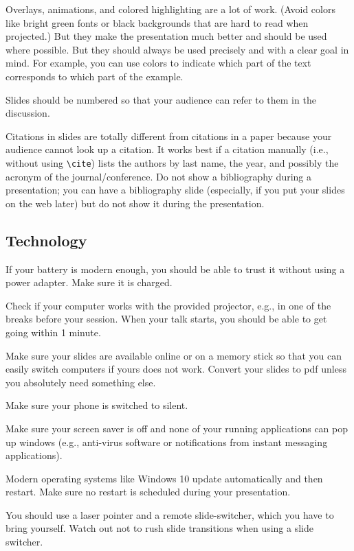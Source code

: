 \documentclass[12pt]{article}
\begin{document}
Overlays, animations, and colored highlighting are a lot of work.
(Avoid colors like bright green fonts or black backgrounds that are hard to read when projected.)
But they make the presentation much better and should be used where possible.
But they should always be used precisely and with a clear goal in mind.
For example, you can use colors to indicate which part of the text corresponds to which part of the example. 
\medskip

Slides should be numbered so that your audience can refer to them in the discussion.
\medskip

Citations in slides are totally different from citations in a paper because your audience cannot look up a citation.
It works best if a citation manually (i.e., without using \verb|\cite|) lists the authors by last name, the year, and possibly the acronym of the journal/conference.
Do not show a bibliography during a presentation; you can have a bibliography slide (especially, if you put your slides on the web later) but do not show it during the presentation.

\subsection{Technology}

If your battery is modern enough, you should be able to trust it without using a power adapter.
Make sure it is charged.
\medskip

Check if your computer works with the provided projector, e.g., in one of the breaks before your session.
When your talk starts, you should be able to get going within 1 minute.
\medskip

Make sure your slides are available online or on a memory stick so that you can easily switch computers if yours does not work.
Convert your slides to pdf unless you absolutely need something else.
\medskip

Make sure your phone is switched to silent.
\medskip

Make sure your screen saver is off and none of your running applications can pop up windows (e.g., anti-virus software or notifications from instant messaging applications).
\medskip

Modern operating systems like Windows 10 update automatically and then restart.
Make sure no restart is scheduled during your presentation.
\medskip

You should use a laser pointer and a remote slide-switcher, which you have to bring yourself.
Watch out not to rush slide transitions when using a slide switcher.
\medskip
\end{document}
